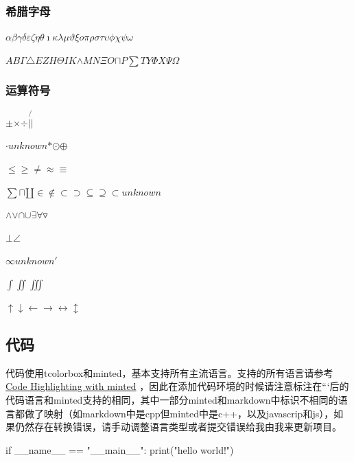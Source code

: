 \documentclass{article}%
\begin{document}
%
\subsubsection{希腊字母}%

%
$\alpha{}$$\beta{}$$\gamma{}$$\delta{}$$\varepsilon{}$$\zeta{}$$\eta{}$$\theta{}$$\imath{}$$\kappa{}$$\lambda{}$$\mu{}$$\vartheta{}$$\xi{}$$o{}$$\pi{}$$\rho{}$$\sigma{}$$\tau{}$$\upsilon{}$$\phi{}$$\chi{}$$\psi{}$$\omega{}$%

%
$A{}$$B{}$$\Gamma{}$$\triangle{}$$E{}$$Z{}$$H{}$$\Theta{}$$I{}$$K{}$$\wedge{}$$M{}$$N{}$$\Xi{}$$O{}$$\sqcap{}$$P{}$$\sum{}$$T{}$$Y{}$$\Phi{}$$X{}$$\Psi{}$$\Omega{}$%

%
\subsubsection{运算符号}%

%
$\pm{}$$\times{}$$\div{}$$|{}$$\not{|}{}$%

%
$\cdot{}$$unknown$$\ast{}$$\odot{}$$\oplus{}$%

%
$\leq{}$$\geq{}$$\neq{}$$\approx{}$$\equiv{}$%

%
$\sum{}$$\sqcap{}$$\amalg{}$$\in{}$$\notin{}$$\subset{}$$\supset{}$$\subseteq{}$$\supseteq{}$$\subset{}$$unknown$%

%
$\wedge{}$$\vee{}$$\cap{}$$\cup{}$$\exists{}$$\forall{}$$\triangledown{}$%

%
$\bot{}$$\angle{}$%

%
$\infty{}$$unknown$$'{}$%

%
$\int{}$$\iint{}$$\iiint{}$%

%
$\uparrow{}$$\downarrow{}$$\leftarrow{}$$\to{}$$\leftrightarrow{}$$\updownarrow{}$%

%
\subsection{代码}%

%
代码使用tcolorbox和minted，基本支持所有主流语言。支持的所有语言请参考 \href{https://www.overleaf.com/learn/latex/Code_Highlighting_with_minted}{Code Highlighting with minted} ，因此在添加代码环境的时候请注意标注在```后的代码语言和minted支持的相同，其中一部分minted和markdown中标识不相同的语言都做了映射（如markdown中是cpp但minted中是c++，以及javascrip和js），如果仍然存在转换错误，请手动调整语言类型或者提交错误给我由我来更新项目。%

%
\begin{langbox}[Python]%
if __name__ == "__main__":%
print("hello world!")%
\end{langbox}%
%
\end{document}
